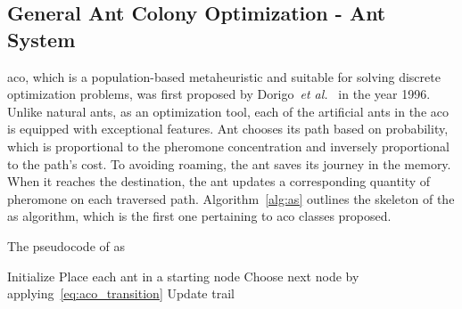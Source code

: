 
\subsection{General Ant Colony Optimization - Ant System}
\acrfull{aco}, which is a population-based metaheuristic and suitable for solving discrete optimization problems, was first proposed by Dorigo~\textit{et al.}~\cite{dorigo1996ant} in the year 1996. Unlike natural ants, as an optimization tool, each of the artificial ants in the \gls{aco} is equipped with exceptional features. Ant chooses its path based on probability, which is proportional to the pheromone concentration and inversely proportional to the path's cost. To avoiding roaming, the ant saves its journey in the memory. When it reaches the destination, the ant updates a corresponding quantity of pheromone on each traversed path. Algorithm~\ref{alg:as} outlines the skeleton of the \gls{as} algorithm, which is the first one pertaining to \gls{aco} classes proposed.

\begin{algorithm}
	\caption{The pseudocode of \gls{as}}
	\label{alg:as}
	\Begin
	{	
		Initialize 
		{
			Place each ant in a starting node\;
			{
				{
					Choose next node by applying~\ref{eq:aco_transition} \;
					Update trail\;
				}
			}
		}
	}
\end{algorithm}

